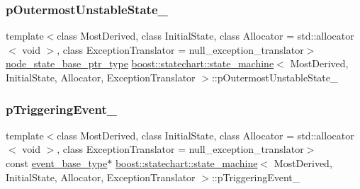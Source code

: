 \mbox{\label{classboost_1_1statechart_1_1state__machine_a4337bcc933d4af38b1a33424eef94e76}} 
\subsubsection{\texorpdfstring{p\+Outermost\+Unstable\+State\+\_\+}{pOutermostUnstableState\_}}
{\footnotesize\ttfamily template$<$class Most\+Derived, class Initial\+State, class Allocator = std\+::allocator$<$ void $>$, class Exception\+Translator = null\+\_\+exception\+\_\+translator$>$ \\
\mbox{\hyperlink{classboost_1_1statechart_1_1state__machine_a5d90f1176309ec8307979aa79dd6f4a3}{node\+\_\+state\+\_\+base\+\_\+ptr\+\_\+type}} \mbox{\hyperlink{classboost_1_1statechart_1_1state__machine}{boost\+::statechart\+::state\+\_\+machine}}$<$ Most\+Derived, Initial\+State, Allocator, Exception\+Translator $>$\+::p\+Outermost\+Unstable\+State\+\_\+\hspace{0.3cm}{\ttfamily [private]}}

\mbox{\label{classboost_1_1statechart_1_1state__machine_a9c2659b211e590134bdfa98105e71db3}} 
\subsubsection{\texorpdfstring{p\+Triggering\+Event\+\_\+}{pTriggeringEvent\_}}
{\footnotesize\ttfamily template$<$class Most\+Derived, class Initial\+State, class Allocator = std\+::allocator$<$ void $>$, class Exception\+Translator = null\+\_\+exception\+\_\+translator$>$ \\
const \mbox{\hyperlink{classboost_1_1statechart_1_1state__machine_adb0e98d6d780a0977209fa7389b20bcd}{event\+\_\+base\+\_\+type}}$\ast$ \mbox{\hyperlink{classboost_1_1statechart_1_1state__machine}{boost\+::statechart\+::state\+\_\+machine}}$<$ Most\+Derived, Initial\+State, Allocator, Exception\+Translator $>$\+::p\+Triggering\+Event\+\_\+\hspace{0.3cm}{\ttfamily [private]}}

